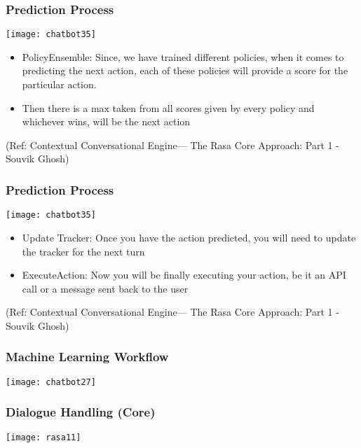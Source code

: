  \begin{frame}[fragile]\frametitle{Prediction Process}
 

\begin{center}
\texttt{[image: chatbot35]}

\end{center}

\begin{itemize}
\item PolicyEnsemble: Since, we have trained different policies, when it comes to predicting the next action, each of these policies will provide a score for the particular action. 
\item Then there is a max taken from all scores given by every policy and whichever wins, will be the next action
\end{itemize}


\tiny{(Ref: Contextual Conversational Engine— The Rasa Core Approach: Part 1 - Souvik Ghosh)}

\end{frame}

 \begin{frame}[fragile]\frametitle{Prediction Process}
 

\begin{center}
\texttt{[image: chatbot35]}

\end{center}

\begin{itemize}
\item Update Tracker: Once you have the action predicted, you will need to update the tracker for the next turn
\item ExecuteAction: Now you will be finally executing your action, be it an API call or a message sent back to the user
\end{itemize}


\tiny{(Ref: Contextual Conversational Engine— The Rasa Core Approach: Part 1 - Souvik Ghosh)}

\end{frame}


 \begin{frame}[fragile]\frametitle{Machine Learning Workflow}
\begin{center}
\texttt{[image: chatbot27]}

\end{center}

\end{frame}
\begin{frame}[fragile]\frametitle{Dialogue Handling (Core)}


\begin{center}
\texttt{[image: rasa11]}
\end{center}


\end{frame}

